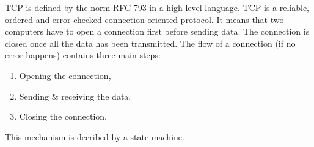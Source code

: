 \documentclass[a4paper, 10pt]{article}
\begin{document}
    TCP is defined by the norm RFC 793 \cite{rfc793} in a high level language.
    TCP is a reliable, ordered and error-checked connection oriented protocol.
    It means that two computers have to open a connection first before sending data.
    The connection is closed once all the data has been transmitted.
    The flow of a connection (if no error happens) contains three main steps:
    \begin{enumerate}
        \item Opening the connection,
        \item Sending \& receiving the data,
        \item Closing the connection.
    \end{enumerate}

    This mechanism is decribed by a state machine.
\end{document}
